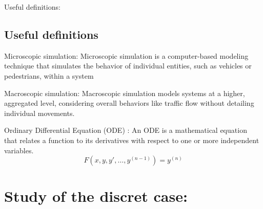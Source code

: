 \documentclass{beamer}
\begin{document}
\begin{frame}{Useful definitions:}
        \subsection{Useful definitions}
	\vspace{-0.2cm}
	\begin{block}{Microscopic simulation:}
		Microscopic simulation is a computer-based modeling technique that simulates the behavior of individual entities, such as vehicles or pedestrians, within a system
	\end{block}
	\vspace{-0.2cm}
	\begin{block}{Macroscopic simulation:}
		Macroscopic simulation models systems at a higher, aggregated level, considering overall behaviors like traffic flow without detailing individual movements.
	\end{block}
	\vspace{-0.2cm}
	\begin{block}{Ordinary Differential Equation (ODE) :}
		An ODE is a mathematical equation that relates a function to its derivatives with respect to one or more independent variables.
		\[
		F\left(x,y,y',\ldots ,y^{(n-1)}\right)=y^{(n)}
		\]
	\end{block}
\end{frame}

\section{Study of the discret case:}
\end{document}

